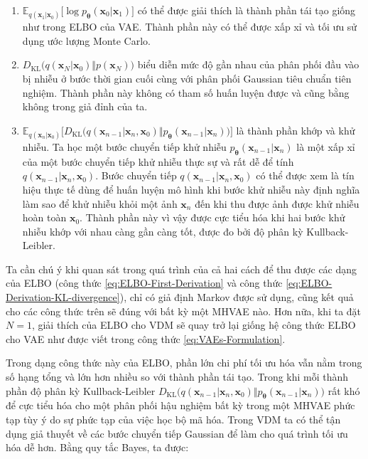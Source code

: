 \documentclass[14pt, a4paper]{article}
\numberwithin{equation}{section}
\numberwithin{figure}{section}
\numberwithin{dl}{section}
\numberwithin{md}{section}
\numberwithin{bd}{section}
\numberwithin{dn}{section}
\numberwithin{hq}{section}
\begin{document}
    \begin{enumerate}
        \item $\mathbb{E}_{q(\boldsymbol{x}_1 \vert \boldsymbol{x}_0)} \lbrack \log p_{\boldsymbol{\theta}} (\boldsymbol{x}_0 \vert \boldsymbol{x}_1) \rbrack$ có thể được giải thích là thành phần tái tạo giống như trong ELBO của VAE.
        Thành phần này có thể được xấp xỉ và tối ưu sử dụng ước lượng Monte Carlo.
        \item $D_{\mathrm{KL}} \big( q(\boldsymbol{x}_N \vert \boldsymbol{x}_0) \Vert p(\boldsymbol{x}_N) \big)$ biểu diễn mức độ gần nhau của phân phối đầu vào bị nhiễu ở bước thời gian cuối cùng với phân phối Gaussian tiêu chuẩn tiên nghiệm.
        Thành phần này không có tham số huấn luyện được và cũng bằng không trong giả đỉnh của ta.
        \item $\mathbb{E}_{q(\boldsymbol{x}_n \vert \boldsymbol{x}_0)} \lbrack D_{\mathrm{KL}} \big( q(\boldsymbol{x}_{n-1} \vert \boldsymbol{x}_n, \boldsymbol{x}_0) \Vert p_{\boldsymbol{\theta}} (\boldsymbol{x}_{n-1} \vert \boldsymbol{x}_n) \big) \rbrack$ là thành phần khớp và khử nhiễu.
        Ta học một bước chuyển tiếp khử nhiễu $p_{\boldsymbol{\theta}} (\boldsymbol{x}_{n-1} \vert \boldsymbol{x}_n)$ là một xấp xỉ của một bước chuyển tiếp khử nhiễu thực sự và rất dễ để tính $q(\boldsymbol{x}_{n-1} \vert \boldsymbol{x}_n, \boldsymbol{x}_0)$.
        Bước chuyển tiếp $q(\boldsymbol{x}_{n-1} \vert \boldsymbol{x}_n, \boldsymbol{x}_0)$ có thể được xem là tín hiệu thực tế dùng để huấn luyện mô hình khi bước khử nhiễu này định nghĩa làm sao để khử nhiễu khỏi một ảnh $\boldsymbol{x}_n$ đến khi thu được ảnh được khử nhiễu hoàn toàn $\boldsymbol{x}_0$.
        Thành phần này vì vậy được cực tiểu hóa khi hai bước khử nhiễu khớp với nhau càng gần càng tốt, được đo bởi độ phân kỳ Kullback-Leibler.
    \end{enumerate}

    Ta cần chú ý khi quan sát trong quá trình của cả hai cách để thu được các dạng của ELBO (công thức \ref{eq:ELBO-First-Derivation} và công thức \ref{eq:ELBO-Derivation-KL-divergence}), chỉ có giả định Markov được sử dụng, cũng kết quả cho các công thức trên sẽ đúng với bất kỳ một MHVAE nào.
    Hơn nữa, khi ta đặt $N=1$, giải thích của ELBO cho VDM sẽ quay trở lại giống hệ công thức ELBO cho VAE như được viết trong công thức \ref{eq:VAEs-Formulation}.

    Trong dạng công thức này của ELBO, phần lớn chi phí tối ưu hóa vẫn nằm trong số hạng tổng và lớn hơn nhiều so với thành phần tái tạo.
    Trong khi mỗi thành phần độ phân kỳ Kullback-Leibler $D_{\mathrm{KL}} \big( q(\boldsymbol{x}_{n-1} \vert \boldsymbol{x}_n, \boldsymbol{x}_0) \Vert p_{\boldsymbol{\theta}} (\boldsymbol{x}_{n-1} \vert \boldsymbol{x}_n) \big)$ rất khó để cực tiểu hóa cho một phân phối hậu nghiệm bất kỳ trong một MHVAE phức tạp tùy ý do sự phức tạp của việc học bộ mã hóa.
    Trong VDM ta có thể tận dụng giả thuyết về các bước chuyển tiếp Gaussian để làm cho quá trình tối ưu hóa dễ hơn.
    Bằng quy tắc Bayes, ta được:
\end{document}
